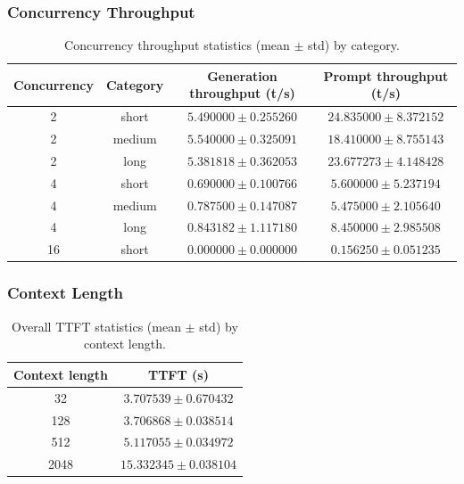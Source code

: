 \documentclass[11pt,a4paper]{article}
\begin{document}
    \subsubsection{Concurrency Throughput}
    \begin{table}[H]
    \centering
    \small
    \setlength{\tabcolsep}{4pt}
    \begin{tabularx}{\textwidth}{c|c|c|c}
        \toprule
        Concurrency & Category & Generation throughput (t/s) & Prompt throughput (t/s) \\
        \midrule
        2  & short  & $5.490000 \pm 0.255260$ & $24.835000 \pm 8.372152$ \\
        2  & medium & $5.540000 \pm 0.325091$ & $18.410000 \pm 8.755143$ \\
        2  & long   & $5.381818 \pm 0.362053$ & $23.677273 \pm 4.148428$ \\
        4  & short  & $0.690000 \pm 0.100766$ & $5.600000 \pm 5.237194$ \\
        4  & medium & $0.787500 \pm 0.147087$ & $5.475000 \pm 2.105640$ \\
        4  & long   & $0.843182 \pm 1.117180$ & $8.450000 \pm 2.985508$ \\
        16 & short  & $0.000000 \pm 0.000000$ & $0.156250 \pm 0.051235$ \\
        \bottomrule
    \end{tabularx}
    \caption{Concurrency throughput statistics (mean $\pm$ std) by category.}
    \label{tab:model_deepdive_concurrency_throughput}
    \end{table}

    \subsubsection{Context Length}
    \begin{table}[H]
    \centering
    \small
    \setlength{\tabcolsep}{4pt}
    \begin{tabularx}{\textwidth}{c|c}
        \toprule
        Context length & TTFT (s) \\
        \midrule
        32   & $3.707539 \pm 0.670432$ \\
        128  & $3.706868 \pm 0.038514$ \\
        512  & $5.117055 \pm 0.034972$ \\
        2048 & $15.332345 \pm 0.038104$ \\
        \bottomrule
    \end{tabularx}
    \caption{Overall TTFT statistics (mean $\pm$ std) by context length.}
    \label{tab:model_deepdive_ttft_context_length}
    \end{table}
\end{document}
